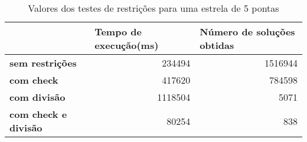 \begin{table}[htbp]
  \centering
  \caption{Valores dos testes de restrições para uma estrela de 5 pontas} 
    \begin{tabular}{lrr} \hline
          & \multicolumn{1}{l}{\textbf{Tempo de execução(ms)}} & \multicolumn{1}{l}{\textbf{Número de soluções obtidas}} \\ \hline
    \textbf{sem restrições} & 234494 & 1516944 \\
    \textbf{com check} & 417620 & 784598 \\
    \textbf{com divisão} & 1118504 & 5071 \\
    \textbf{com check e divisão} & 80254 & 838 \\ \hline
    \end{tabular}%
  \label{tab:tabela_restricoes}%
\end{table}%
